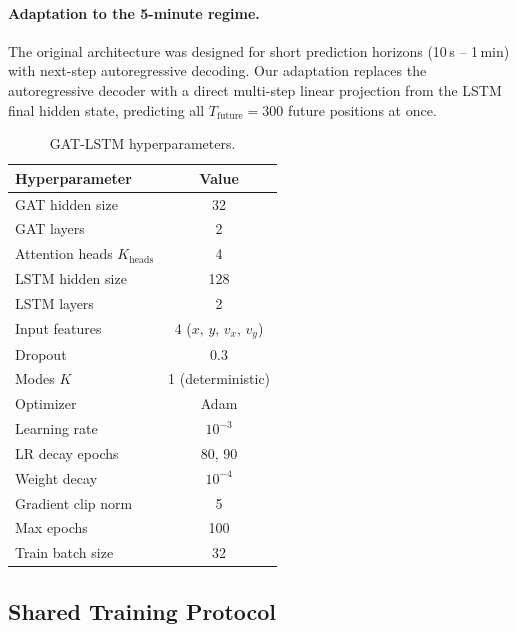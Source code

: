 \documentclass[12pt, a4paper]{article}
\begin{document}
\paragraph{Adaptation to the 5-minute regime.}
The original architecture was designed for short prediction horizons
(10\,s -- 1\,min) with next-step autoregressive decoding.
Our adaptation replaces the autoregressive decoder with a direct
multi-step linear projection from the LSTM final hidden state,
predicting all $T_{\text{future}} = 300$ future positions at once.

\begin{table}[H]
  \centering
  \caption{GAT-LSTM hyperparameters.}
  \label{tab:gatlstm_hp}
  \begin{tabular}{lc}
    \toprule
    \textbf{Hyperparameter} & \textbf{Value} \\
    \midrule
    GAT hidden size                        & 32 \\
    GAT layers                             & 2 \\
    Attention heads $K_{\text{heads}}$     & 4 \\
    LSTM hidden size                       & 128 \\
    LSTM layers                            & 2 \\
    Input features                         & 4 ($x,\,y,\,v_x,\,v_y$) \\
    Dropout                                & 0.3 \\
    Modes $K$                              & 1 (deterministic) \\
    Optimizer                              & Adam \\
    Learning rate                          & $10^{-3}$ \\
    LR decay epochs                        & 80, 90 \\
    Weight decay                           & $10^{-4}$ \\
    Gradient clip norm                     & 5 \\
    Max epochs                             & 100 \\
    Train batch size                       & 32 \\
    \bottomrule
  \end{tabular}
\end{table}
\subsection{Shared Training Protocol}
\label{sec:training_protocol}
\end{document}
